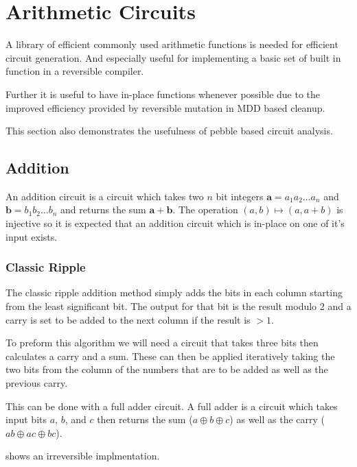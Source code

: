 \chapter{Arithmetic Circuits}

A library of efficient commonly used arithmetic functions is needed for
efficient circuit generation. And especially useful for implementing a basic set
of built in function in a reversible compiler.

Further it is useful to have in-place functions whenever possible due to the
improved efficiency provided by reversible mutation in MDD based cleanup.

This section also demonstrates the usefulness of pebble based circuit analysis.

\section{Addition}

  An addition circuit is a circuit which takes two $n$ bit integers $\mathbf{a} =
  a_1a_2\dotsc a_n$ and $\mathbf{b} = b_1b_2\dotsc b_n$ and returns the sum
  $\mathbf{a}+\mathbf{b}$. The operation $(a,b)\mapsto (a,a+b)$ is injective so
  it is expected that an addition circuit which is in-place on one of it's input exists.

  \subsection{Classic Ripple}

    The classic ripple addition method simply adds the bits in each column
    starting from the least significant bit.  The output for that bit is the
    result modulo 2 and a carry is set to be added to the next column if the
    result is $>1$.

    To preform this algorithm we will need a circuit that takes three bits then
    calculates a carry and a sum.  These can then be applied iteratively taking
    the two bits from the column of the numbers that are to be added as well as
    the previous carry.

    This can be done with a full adder circuit.  A full adder is a circuit which
    takes input bits $a$, $b$, and $c$ then returns the sum ($a \oplus b \oplus
    c$) as well as the carry ($ab\oplus ac \oplus bc$).

     shows an irreversible implmentation.


